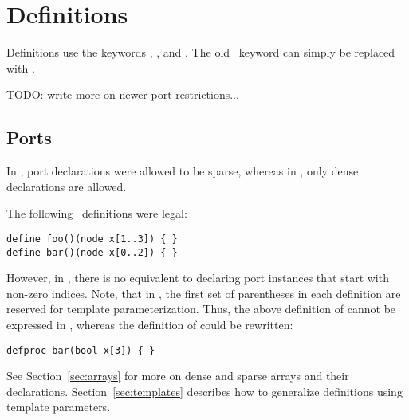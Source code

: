 
\section{Definitions}
\label{sec:definitions}

Definitions use the keywords , , and .  
The old \CAST\ keyword  can simply be replaced with .  

TODO: write more on newer port restrictions...

\subsection{Ports}
\label{sec:definitions:ports}

In \CAST, port declarations were allowed to be sparse, 
whereas in \hac, only dense declarations are allowed.

The following \CAST\ definitions were legal:

\begin{verbatim}
define foo()(node x[1..3]) { }
define bar()(node x[0..2]) { }
\end{verbatim}

However, in \hac, there is no equivalent to declaring port instances
that start with non-zero indices.  
Note, that in \CAST, the first set of parentheses in each definition
are reserved for template parameterization.  
Thus, the above definition of  cannot be expressed in \hac, 
whereas the definition of  could be rewritten:

\begin{verbatim}
defproc bar(bool x[3]) { }
\end{verbatim}

See Section~\ref{sec:arrays} for more on dense and sparse arrays 
and their declarations.  
Section~\ref{sec:templates} describes how to generalize definitions
using template parameters.  


